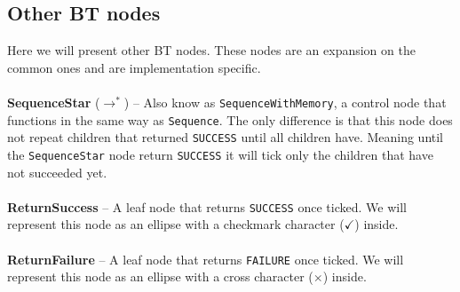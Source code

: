     \subsection{Other BT nodes}
        Here we will present other BT nodes. These nodes are an expansion on the common ones and are implementation specific.\\\\
        \textbf{SequenceStar} ($\to^{*}$) -- Also know as \texttt{SequenceWithMemory}, a control node that functions in the same way as \texttt{Sequence}. The only difference is that this node does not repeat children that returned \texttt{SUCCESS} until all children have. Meaning until the \texttt{SequenceStar} node return \texttt{SUCCESS} it will tick only the children that have not succeeded yet.\\\\
        \textbf{ReturnSuccess} -- A leaf node that returns \texttt{SUCCESS} once ticked. We will represent this node as an ellipse with a checkmark character ($\checkmark$) inside.\\\\
        \textbf{ReturnFailure} -- A leaf node that returns \texttt{FAILURE} once ticked. We will represent this node as an ellipse with a cross character ($\times$) inside.